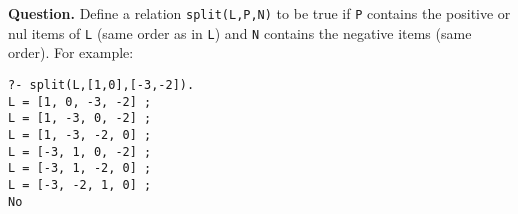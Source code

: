     \noindent\textbf{Question.} Define a relation \texttt{split(L,P,N)} to
    be true if \texttt{P} contains the positive or nul items of
    \texttt{L} (same order as in \texttt{L}) and \texttt{N} contains
    the negative items (same order). For example:
{\small
\begin{verbatim}
?- split(L,[1,0],[-3,-2]).
L = [1, 0, -3, -2] ;
L = [1, -3, 0, -2] ;
L = [1, -3, -2, 0] ;
L = [-3, 1, 0, -2] ;
L = [-3, 1, -2, 0] ;
L = [-3, -2, 1, 0] ;
No
\end{verbatim}
}
